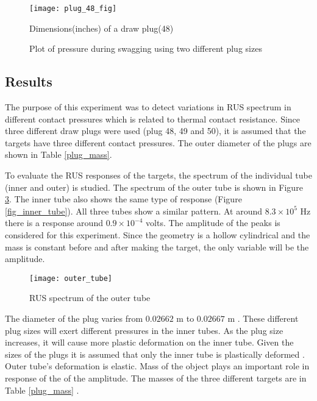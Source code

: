 \begin{doublespacing}
\begin{figure}[H]
\centering
\texttt{[image: plug\_48\_fig]}
\caption{Dimensions(inches) of a draw plug(48)}
\label{fig_plug48}
\end{figure}


 
 
\begin{figure}[H]
	\hfill
	\caption{Plot of pressure during swagging using two different plug sizes}
	\label{p_48_50}
\end{figure}

\newpage
\subsection{Results}

The purpose of this experiment was to detect variations in RUS spectrum in different contact pressures which is related to thermal contact resistance. Since three different draw plugs were used (plug 48, 49 and 50), it is assumed that the targets have three different contact pressures. The outer  diameter of the plugs are shown in Table \ref{plug_mass}. 

 To evaluate the RUS responses of the targets, the spectrum of the individual tube (inner and outer) is studied. The spectrum of the outer tube is shown in Figure \ref{outer_tube}. The inner tube also shows the same type of response (Figure \ref{fig_inner_tube}). All three tubes show a similar pattern. At around $8.3\times10^5$ Hz there is a response around $0.9\times10^{-4}$ volts. The amplitude of the peaks is considered for this experiment. Since the geometry is a hollow cylindrical and the mass is constant before and after making the target, the only variable will be the amplitude.


\begin{figure}[H]
\centering
\texttt{[image: outer\_tube]} 
\caption{RUS spectrum of the outer tube}  
\label{outer_tube} 
\end{figure}
The diameter of the plug varies from $0.02662$ m to $0.02667$ m . These different plug sizes will exert different pressures in the inner tubes. As the plug size increases, it will cause more plastic deformation on the inner tube. 
Given the sizes of the plugs it is assumed that only the inner tube is plastically deformed \cite{annemarie}. Outer tube's deformation is elastic.  Mass of the object plays an important role in response of the of the amplitude. The masses of the three different targets are in Table \ref{plug_mass} . \\[0.5 in]




\end{doublespacing}
